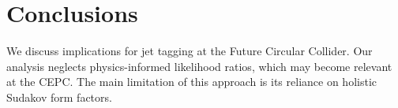 \section{Conclusions}\label{sec:conclusions}

We discuss implications for jet tagging at the Future Circular Collider.
Our analysis neglects physics-informed likelihood ratios, which may
become relevant at the CEPC. The main limitation of this approach is its
reliance on holistic Sudakov form factors.

